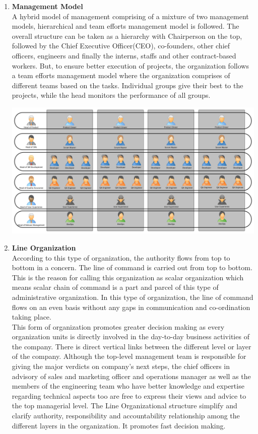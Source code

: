 \documentclass[12pt,a4paper]{scrreprt}
\begin{document}
\begin{enumerate}
    \item \textbf{Management Model} \\
    A hybrid model of management comprising of a mixture of two management models, hierarchical and team efforts management model is followed. The overall structure can be taken as a hierarchy with Chairperson on the top, followed by the Chief Executive Officer(CEO), co-founders, other chief officers, engineers and finally the interns, staffs and other contract-based workers. But, to ensure better execution of projects, the organization follows a team efforts management model where the organization comprises of different teams based on the tasks. Individual groups give their best to the projects, while the head monitors the performance of all groups.

    \begin{center}
        \includegraphics[scale=0.28]{team-based-MM}
    \end{center}

    \item \textbf{Line Organization} \\
    According to this type of organization, the authority flows from top to bottom in a concern. The line of command is carried out from top to bottom. This is the reason for calling this organization as scalar organization which means scalar chain of command is a part and parcel of this type of administrative organization. In this type of organization, the line of command flows on an even basis without any gaps in communication and co-ordination taking place. \\
    This form of organization promotes greater decision making as every organization units is directly involved in the day-to-day business activities of the company. There is direct vertical links between the different level or layer of the company. Although the top-level management team is responsible for giving the major verdicts on company’s next steps, the chief officers in advisory of sales and marketing officer and operations manager as well as the members of the engineering team who have better knowledge and expertise regarding technical aspects too are free to express their views and advice to the top managerial level. The Line Organizational structure simplify and clarify authority, responsibility and accountability relationship among the different layers in the organization. It promotes fast decision making.


\end{enumerate}
\end{document}
